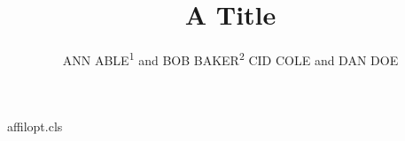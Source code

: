 \begin{filecontents*}[overwrite]{affilopt.cls}
\def\author#1{\gdef\@author{#1}}
\newcommand\affil[2][]{{\reset@font\small\unskip,\ \textsuperscript{#1}#2\endgraf}}
\def\maketitle{\par{\Large\@title\par}{\noindent\@author\par}}
\end{filecontents*}
\documentclass{affilopt}

\title{A Title}
\author{ANN ABLE\textsuperscript{1} and BOB BAKER\textsuperscript{2}   CID COLE and DAN DOE }
\maketitle
Body.

